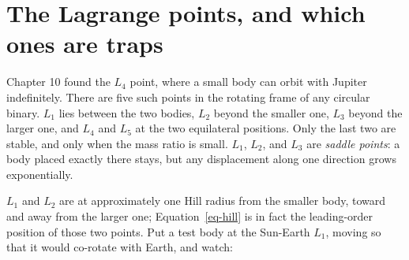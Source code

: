 \documentclass[
  10.5pt,
  letterpaper,
]{scrbook}
\theoremstyle{plain}
\theoremstyle{remark}
\begin{document}
\section{The Lagrange points, and which ones are
traps}\label{the-lagrange-points-and-which-ones-are-traps}

Chapter 10 found the \(L_4\) point, where a small body can orbit with
Jupiter indefinitely. There are five such points in the rotating frame
of any circular binary. \(L_1\) lies between the two bodies, \(L_2\)
beyond the smaller one, \(L_3\) beyond the larger one, and \(L_4\) and
\(L_5\) at the two equilateral positions. Only the last two are stable,
and only when the mass ratio is small. \(L_1\), \(L_2\), and \(L_3\) are
\emph{saddle points}: a body placed exactly there stays, but any
displacement along one direction grows exponentially.

\(L_1\) and \(L_2\) are at approximately one Hill radius from the
smaller body, toward and away from the larger one;
Equation~\ref{eq-hill} is in fact the leading-order position of those
two points. Put a test body at the Sun-Earth \(L_1\), moving so that it
would co-rotate with Earth, and watch:
\end{document}
